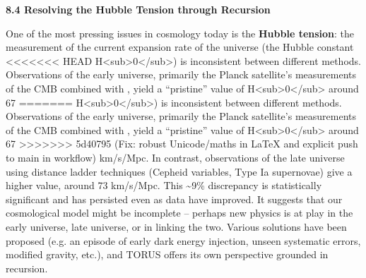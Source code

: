 \documentclass[]{article}
\begin{document}
\textbf{8.4 Resolving the Hubble Tension through Recursion}

One of the most pressing issues in cosmology today is the \textbf{Hubble
tension}: the measurement of the current expansion rate of the universe
(the Hubble constant
<<<<<<< HEAD
H\textless sub\textgreater0\textless/sub\textgreater) is inconsistent
between different methods. Observations of the early universe, primarily
the Planck satellite's measurements of the CMB combined with \LambdaCDM, yield
a ``pristine'' value of
H\textless sub\textgreater0\textless/sub\textgreater{} around 67
=======
H\textless{}sub\textgreater{}0\textless{}/sub\textgreater{}) is
inconsistent between different methods. Observations of the early
universe, primarily the Planck satellite's measurements of the CMB
combined with \LambdaCDM, yield a ``pristine'' value of
H\textless{}sub\textgreater{}0\textless{}/sub\textgreater{} around 67
>>>>>>> 5d40795 (Fix: robust Unicode/maths in LaTeX and explicit push to main in workflow)
km/s/Mpc. In contrast, observations of the late universe using distance
ladder techniques (Cepheid variables, Type Ia supernovae) give a higher
value, around 73 km/s/Mpc. This \textasciitilde{}9\% discrepancy is
statistically significant and has persisted even as data have improved.
It suggests that our cosmological model might be incomplete -- perhaps
new physics is at play in the early universe, late universe, or in
linking the two. Various solutions have been proposed (e.g. an episode
of early dark energy injection, unseen systematic errors, modified
gravity, etc.), and TORUS offers its own perspective grounded in
recursion.
\end{document}
